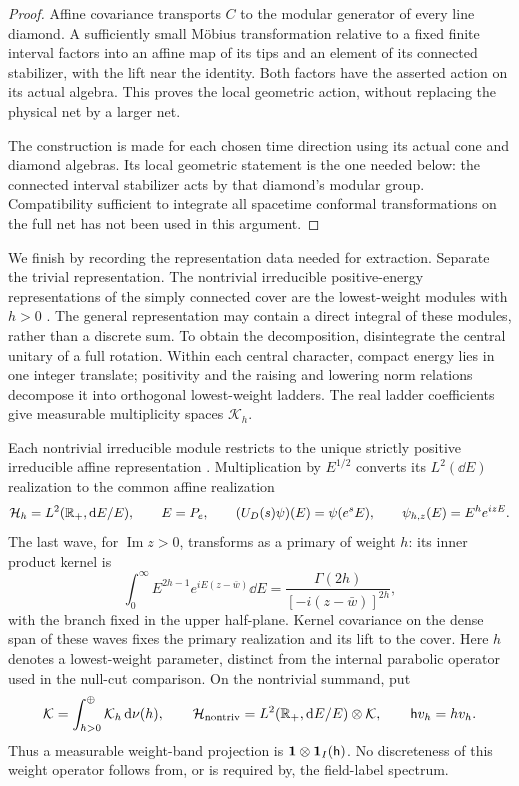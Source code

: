 \begin{proof}
Affine covariance transports $C$ to the modular
generator of every line diamond. A sufficiently small
M\"obius transformation relative to a fixed finite
interval factors into an affine map of its tips and
an element of its connected stabilizer, with the lift
near the identity. Both factors have the
asserted action on its actual algebra. This proves
the local geometric action, without replacing the
physical net by a larger net.

The construction is made for each chosen time direction using its
actual cone and diamond algebras.  Its local geometric statement is
the one needed below: the connected interval stabilizer acts by that
diamond's modular group.  Compatibility sufficient to integrate all
spacetime conformal transformations on the full net has not been
used in this argument.
\end{proof}

We finish by recording the representation data needed for extraction.
Separate the trivial representation. The nontrivial irreducible
positive-energy representations of the simply connected cover are
the lowest-weight modules with $h>0$
\cite[Theorem~1.5.3 and the following direct-integral discussion]{LongoLectures2008}.
The general representation may contain a direct integral of these
modules, rather than a discrete sum. To obtain the decomposition,
disintegrate the central unitary of a full rotation. Within each
central character, compact energy lies in one integer translate;
positivity and the raising and lowering norm relations decompose it
into orthogonal lowest-weight ladders. The real ladder coefficients
give measurable multiplicity spaces $\mathcal K_h$.

Each nontrivial irreducible module restricts to the unique strictly
positive irreducible affine representation
\cite[Corollary~2.33 and equation~(6)]{NeebOlafsson2017}.
Multiplication by $E^{1/2}$ converts its $L^2(\dd E)$ realization
to the common affine realization
\begin{equation}\label{C:time-primary-waves}
 \mathcal H_h=L^2(\mathbb R_+,\mathrm d E/E),\qquad
 E=P_e,\qquad
 (U_D(s)\psi)(E)=\psi(e^sE),\qquad
 \psi_{h,z}(E)=E^he^{izE}.
\end{equation}
The last wave, for $\operatorname{Im}z>0$, transforms as a primary of
weight $h$: its inner product kernel is
\[
 \int_0^\infty E^{2h-1}e^{iE(z-\bar w)}\dd E
 =\frac{\Gamma(2h)}{[-i(z-\bar w)]^{2h}},
\]
with the branch fixed in the upper half-plane. Kernel covariance on
the dense span of these waves fixes the primary realization and its
lift to the cover.
Here $h$ denotes a lowest-weight parameter, distinct from the internal
parabolic operator used in the null-cut comparison.
On the nontrivial summand, put
\[
 \mathcal K=\int_{h>0}^{\oplus}\mathcal K_h\,\mathrm d\nu(h),\qquad
 \mathcal H_{\mathrm{nontriv}}=L^2(\mathbb R_+,\mathrm d E/E)\otimes\mathcal K,
 \qquad \mathsf h v_h=h v_h.
\]
Thus a measurable weight-band projection is
$\mathbf 1\otimes\mathbf1_I(\mathsf h)$. No discreteness of this weight
operator follows from, or is required by, the field-label spectrum.

